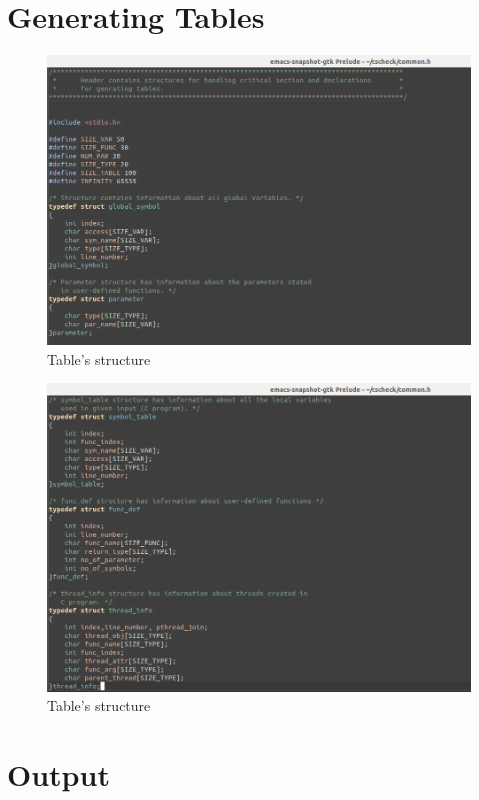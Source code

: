 \section{Generating Tables}
\begin{figure}[H]
\centering
\includegraphics[scale=0.4]{Snaps/common_1.png}
\caption{Table's structure}
\label{<<Label>>}
\end{figure}
\begin{figure}[H]
\centering
\includegraphics[scale=0.4]{Snaps/common_2.png}
\caption{Table's structure}
\label{<<Label>>}
\end{figure}

\section{Output}

